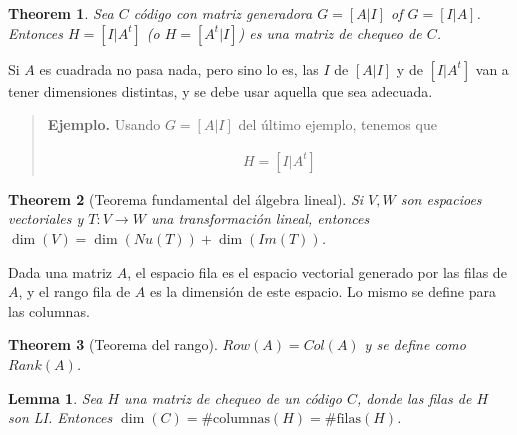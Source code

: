 \documentclass[a4paper]{article}
\newtheorem{lemma}{Lemma}
\newtheorem{theorem}{Theorem}
\newtheorem{lemma}{Lemma}
\newtheorem{theorem}{Theorem}
\begin{document}
\begin{theorem}
    Sea $C$ código con matriz generadora $G = [A | I]$ of $G = [I | A]$.
    Entonces $H = [I | A^t]$  (o $H = [A^t | I]$) es una matriz de 
    chequeo de $C$.
\end{theorem}

Si $A$ es cuadrada no pasa nada, pero sino lo es, las $I$ de $[A|I]$ y de $[I |
A^t]$ van a tener dimensiones distintas, y se debe usar aquella que sea
adecuada.


\small
\begin{quote}

    \textbf{Ejemplo.} Usando $G = [A | I]$ del último ejemplo, tenemos que 

\begin{align*}
    H = [I | A^t]
\end{align*}

\end{quote}
\normalsize

\begin{theorem}[Teorema fundamental del álgebra lineal]
    Si $V, W$ son espacioes vectoriales y $T : V \to W$ una transformación lineal, 
    entonces $\dim(V) = \dim \left( Nu(T) \right) + \dim \left( Im (T) \right) $.
\end{theorem}

\begin{definition}
    Dada una matriz $A$, el espacio fila es el espacio vectorial generado por las filas 
    de $A$, y el rango fila de $A$ es la dimensión de este espacio. Lo mismo se define 
    para las columnas.
\end{definition}

\begin{theorem}[Teorema del rango]

    $Row(A) = Col(A)$ y se define como $Rank(A)$.
    
\end{theorem}

\begin{lemma}
    Sea $H$ una matriz de chequeo de un código $C$, donde las filas de $H$ son LI. 
    Entonces $\dim(C) = \# \text{columnas}(H) = \# \text{filas}(H)$.
\end{lemma}
\end{document}
